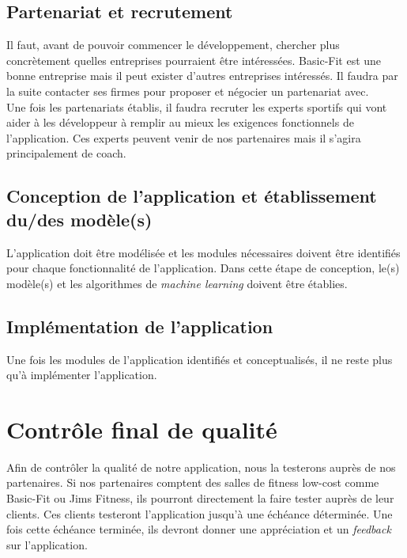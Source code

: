 \subsection*{Partenariat et recrutement}

Il faut, avant de pouvoir commencer le développement, chercher plus concrètement quelles entreprises pourraient être intéressées. Basic-Fit est une bonne entreprise mais il peut exister d'autres entreprises intéressés. Il faudra par la suite contacter ses firmes pour proposer et négocier un partenariat avec.\\
Une fois les partenariats établis, il faudra recruter les experts sportifs qui vont aider à les développeur à remplir au mieux les exigences fonctionnels de l'application. Ces experts peuvent venir de nos partenaires mais il s'agira principalement de coach. 

\subsection*{Conception de l'application et établissement du/des modèle(s)}

L'application doit être modélisée et les modules nécessaires doivent être identifiés pour chaque fonctionnalité de l'application. Dans cette étape de conception, le(s) modèle(s) et les algorithmes de \textit{machine learning} doivent être établies. 

\subsection*{Implémentation de l'application}

Une fois les modules de l'application identifiés et conceptualisés, il ne reste plus qu'à implémenter l'application. 

\section{Contrôle final de qualité}

Afin de contrôler la qualité de notre application, nous la testerons auprès de nos partenaires. Si nos partenaires comptent des salles de fitness low-cost comme Basic-Fit ou Jims Fitness, ils pourront directement la faire tester auprès de leur clients. Ces clients testeront l'application jusqu'à une échéance déterminée. Une fois cette échéance terminée, ils devront donner une appréciation et un \textit{feedback} sur l'application.\\

